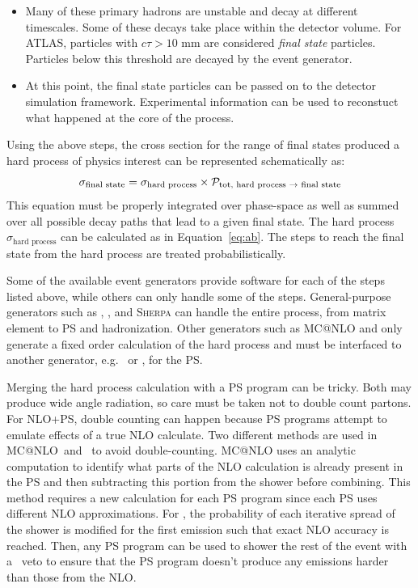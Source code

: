 \begin{itemize}
\item Many of these primary hadrons are unstable and decay at different timescales. Some of these decays take place within the detector volume. For ATLAS, particles with $c\tau > 10$ mm are considered \emph{final state} particles. Particles below this threshold are decayed by the event generator. 
\item At this point, the final state particles can be passed on to the detector simulation framework. Experimental information can be used to reconstuct what happened at the core of the process.
\end{itemize}

Using the above steps, the cross section for the range of final states produced a hard process of physics interest can be represented schematically as:
\begin{equation}
\sigma_{\text{final state}}=\sigma_{\text{hard process}} \times \mathcal{P}_{\text{tot, hard process \rarrow final state}}
\label{eq:finalst}
\end{equation}
This equation must be properly integrated over phase-space as well as summed over all possible decay paths that lead to a given final state. The hard process $\sigma_{\text{hard process}}$ can be calculated as in Equation~\ref{eq:ab}. The steps to reach the final state from the hard process are treated probabilistically.


Some of the available event generators provide software for each of the steps listed above, while others can only handle some of the steps. General-purpose generators such as \py, \hw, and \textsc{Sherpa} can handle the entire process, from matrix element to PS and hadronization. Other generators such as \textsc{MC@NLO}\cite{mcatnlo,mcatnlo2} and \pow \cite{Powheg,Powheg2,Powheg3,Powheg4} only generate a fixed order calculation of the hard process and must be interfaced to another generator, e.g. \py\ or \hw, for the PS. 

Merging the hard process calculation with a PS program can be tricky. Both may produce wide angle radiation, so care must be taken not to double count partons. For NLO+PS, double counting can happen because PS programs attempt to emulate effects of a true NLO calculate. Two different methods are used in \textsc{MC@NLO}\ and \pow\ to avoid double-counting. \textsc{MC@NLO}\cite{mcatnlo} uses an analytic computation to identify what parts of the NLO calculation is already present in the PS and then subtracting this portion from the shower before combining. This method requires a new calculation for each PS program since each PS uses different NLO approximations. For \pow\cite{Powheg,Powheg2}, the probability of each iterative spread of the shower is modified for the first emission such that exact NLO accuracy is reached. Then, any PS program can be used to shower the rest of the event with a \pt\ veto to ensure that the PS program doesn't produce any emissions harder than those from the NLO.

